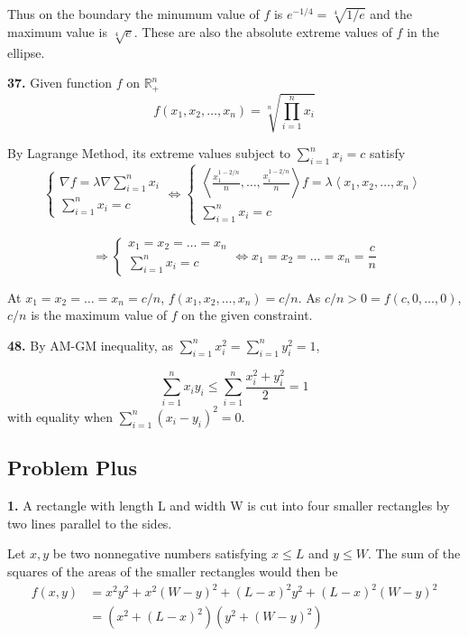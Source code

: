 \documentclass[a4paper,12pt]{article}
\newcommand{\exercise}[1]{\noindent\textbf{#1.}}
\begin{document}
Thus on the boundary the minumum value of $f$ is $e^{-1/4} = \sqrt[4]{1/e}$
and the maximum value is $\sqrt[4] e$. These are also the absolute extreme
values of $f$ in the ellipse.

\exercise{37} Given function $f$ on $\mathbb{R}_+^n$
\[f(x_1, x_2, \ldots, x_n) = \sqrt[n]{\prod_{i=1}^n x_i}\]

By Lagrange Method, its extreme values subject to $\sum_{i=1}^n x_i = c$ satisfy
\[\begin{cases}
  \nabla f = \lambda\nabla\sum_{i=1}^n x_i\\
  \sum_{i=1}^n x_i = c
\end{cases}
\iff
\begin{cases}
  \left<\frac{x_1^{1-2/n}}{n}, \ldots, \frac{x_i^{1-2/n}}{n}\right>f
  = \lambda\left<x_1, x_2, \ldots, x_n\right>\\
  \sum_{i=1}^n x_i = c
\end{cases}\]

\[\Longrightarrow
\begin{cases}
  x_1 = x_2 = \ldots = x_n\\
  \sum_{i=1}^n x_i = c
\end{cases}
\iff x_1 = x_2 = \ldots = x_n = \frac{c}{n}\]

At $x_1 = x_2 = \ldots = x_n = c/n$, $f(x_1, x_2, \ldots, x_n) = c/n$.
As $c/n > 0 = f(c, 0, \ldots, 0)$, $c/n$ is the maximum value of $f$
on the given constraint.

\exercise{48} By AM-GM inequality,
as $\sum_{i=1}^n x_i^2 = \sum_{i=1}^n y_i^2 = 1$,

\[\sum_{i=1}^n x_i y_i \leq \sum_{i=1}^n\frac{x_i^2 + y_i^2}{2} = 1\]
with equality when $\sum_{i=1}^n(x_i - y_i)^2 = 0$.

\subsection*{Problem Plus}
\exercise{1} A rectangle with length L and width W is cut into four smaller
rectangles by two lines parallel to the sides.

Let $x, y$ be two nonnegative numbers satisfying $x \leq L$ and $y \leq W$.
The sum of the squares of the areas of the smaller rectangles would then be
\begin{align*}
  f(x, y) &= x^2y^2 + x^2(W-y)^2 + (L-x)^2y^2 + (L-x)^2(W-y)^2\\
  &= (x^2 + (L-x)^2)(y^2 + (W-y)^2)\\
\end{align*}
\end{document}
